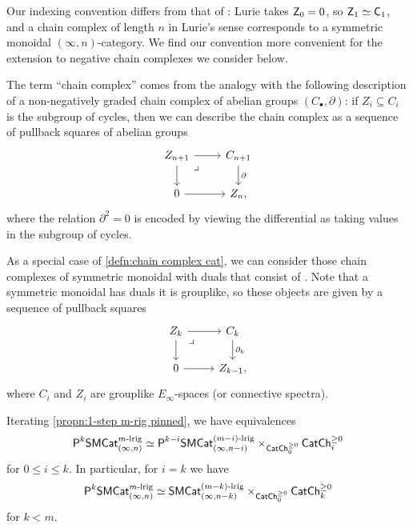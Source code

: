 \documentclass[a4paper,11pt]{article}
\begin{document}
\begin{warning}
  Our indexing convention differs from that of \cite{LurieCob}:
  Lurie takes $\oZ_{0} = 0$, so $\oZ_{1} \simeq \oC_{1}$, and a chain
  complex of length $n$ in Lurie's sense corresponds to a symmetric
  monoidal $(\infty,n)$-category. We find our convention more
  convenient for the extension to negative chain complexes we consider
  below.
\end{warning}

\begin{remark}\label{rmk:chain complex motivation}
  The term ``chain complex'' comes from the analogy with the following
  description of a non-negatively graded chain complex of abelian groups
  $(C_{\bullet}, \partial)$: if $Z_{i} \subseteq C_{i}$ is the
  subgroup of cycles, then we can describe the chain complex as a
  sequence of pullback squares of abelian groups
    \[
    \begin{tikzcd}
      Z_{n+1} \drpullback \ar[r] \ar[d] & C_{n+1} \ar[d, "\partial"] \\
      0  \ar[r] & Z_{n},
    \end{tikzcd}
  \]
  where the relation $\partial^{2} = 0$ is encoded by viewing the
  differential as taking values in the subgroup of cycles.
\end{remark}

\begin{remark}
  As a special case of \cref{defn:chain complex cat}, we can consider
  those chain complexes of symmetric monoidal \icats{} with duals
  that consist of \igpds{}. Note that a symmetric monoidal \igpd{} has
  duals \IFF{} it is grouplike, so these objects are given by a
  sequence of pullback squares
  \begin{equation}
    \label{eq:cchpb}
    \begin{tikzcd}
      Z_{k} \drpullback \ar[r] \ar[d] & C_{k} \ar[d, "\partial_{k}"] \\
      0  \ar[r] & Z_{k-1},
    \end{tikzcd}
  \end{equation}
  where $C_{i}$ and $Z_{i}$ are grouplike $E_{\infty}$-spaces (or
  connective spectra). 
\end{remark}


\begin{cornoproof}\label{cor:unfold pinned}
  Iterating \cref{propn:1-step m-rig pinned}, we have equivalences
  \[ \PSMCat[k]_{(\infty,n)}^{m\dlrig} \simeq
    \PSMCat[k-i]_{(\infty,n-i)}^{(m-i)\dlrig} \times_{\CChp_{0}} \CChp_{i}
  \]
  for $0 \leq i \leq k$. In particular, for $i = k$ we have
  \[ \PSMCat[k]_{(\infty,n)}^{m\dlrig} \simeq
    \SMCat_{(\infty,n-k)}^{(m-k)\dlrig} \times_{\CChp_{0}}
    \CChp_{k}\]
  for $k < m$.
\end{cornoproof}
\end{document}
